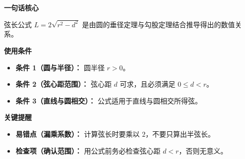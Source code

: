 \begin{summarybox}
	\textbf{\textcolor{CSummary}{一句话核心}}

	弦长公式 $L=2\sqrt{r^{2}-d^{2}}$ 是由圆的垂径定理与勾股定理结合推导得出的数值关系。

	\medskip
	\textbf{\textcolor{CSummary}{使用条件}}
	\begin{itemize}[leftmargin=*, itemsep=0.5em, topsep=0.4em]
		\item \textbf{条件 1（圆与半径）：} 圆半径 $r>0$。
		\item \textbf{条件 2（弦心距范围）：} 弦心距 $d$ 可求，且必须满足 $0\le d<r$。
		\item \textbf{条件 3（直线与圆相交）：} 公式适用于直线与圆相交所得弦。
	\end{itemize}

	\medskip
	\textbf{\textcolor{CSummary}{关键提醒}}
	\begin{itemize}[leftmargin=*, itemsep=0.5em, topsep=0.4em]
		\item \textbf{易错点（漏乘系数）：} 计算弦长时要乘以 $2$，不要只算出半弦长。
		\item \textbf{检查项（确认范围）：} 用公式前务必检查弦心距 $d<r$，否则无意义。
	\end{itemize}
\end{summarybox}
